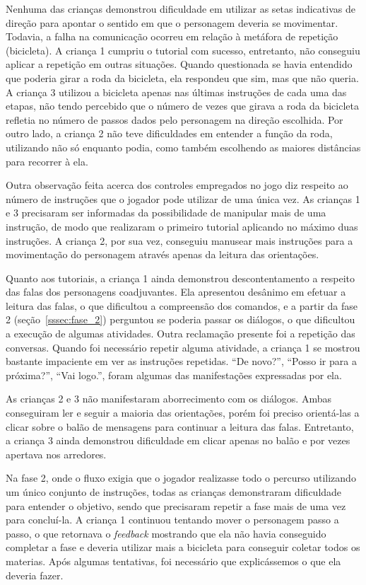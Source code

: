 Nenhuma das crianças demonstrou dificuldade em utilizar as setas indicativas de direção para apontar o sentido em que o personagem deveria se movimentar. Todavia, a falha na comunicação ocorreu em relação à metáfora de repetição (bicicleta). A criança 1 cumpriu o tutorial com sucesso, entretanto, não conseguiu aplicar a repetição em outras situações. Quando questionada se havia entendido que poderia girar a roda da bicicleta, ela respondeu que sim, mas que não queria. A criança 3 utilizou a bicicleta apenas nas últimas instruções de cada uma das etapas, não tendo percebido que o número de vezes que girava a roda da bicicleta refletia no número de passos dados pelo personagem na direção escolhida. Por outro lado, a criança 2 não teve dificuldades em entender a função da roda, utilizando não só enquanto podia, como também escolhendo as maiores distâncias para recorrer à ela.

Outra observação feita acerca dos controles empregados no jogo diz respeito ao número de instruções que o jogador pode utilizar de uma única vez. As crianças 1 e 3 precisaram ser informadas da possibilidade de manipular mais de uma instrução, de modo que realizaram o primeiro tutorial aplicando no máximo duas instruções. A criança 2, por sua vez, conseguiu manusear mais instruções para a movimentação do personagem através apenas da leitura das orientações.

Quanto aos tutoriais, a criança 1 ainda demonstrou descontentamento a respeito das falas dos personagens coadjuvantes. Ela apresentou desânimo em efetuar a leitura das falas, o que dificultou a compreensão dos comandos, e a partir da fase 2 (seção~\ref{sssec:fase_2}) perguntou se poderia passar os diálogos, o que dificultou a execução de algumas atividades. Outra reclamação presente foi a repetição das conversas. Quando foi necessário repetir alguma atividade, a criança 1 se mostrou bastante impaciente em ver as instruções repetidas. “De novo?”, “Posso ir para a próxima?”, “Vai logo.”, foram algumas das manifestações expressadas por ela.

As crianças 2 e 3 não manifestaram aborrecimento com os diálogos. Ambas conseguiram ler e seguir a maioria das orientações, porém foi preciso orientá-las a clicar sobre o balão de mensagens para continuar a leitura das falas. Entretanto, a criança 3 ainda demonstrou dificuldade em clicar apenas no balão e por vezes apertava nos arredores.

Na fase 2, onde o fluxo exigia que o jogador realizasse todo o percurso utilizando um único conjunto de instruções, todas as crianças demonstraram dificuldade para entender o objetivo, sendo que precisaram repetir a fase mais de uma vez para concluí-la. A criança 1 continuou tentando mover o personagem passo a passo, o que retornava o \textit{feedback} mostrando que ela não havia conseguido completar a fase e deveria utilizar mais a bicicleta para conseguir coletar todos os materias. Após algumas tentativas, foi necessário que explicássemos o que ela deveria fazer. 

